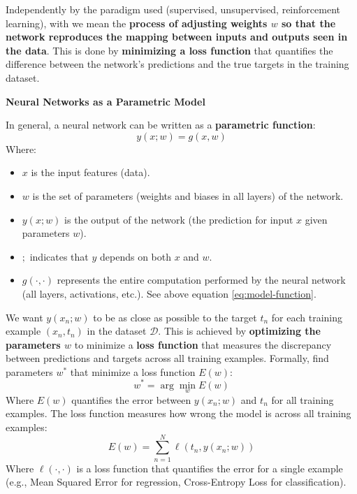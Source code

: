 \highspace
Independently by the paradigm used (supervised, unsupervised, reinforcement learning), with  we mean the \textbf{process of adjusting weights $w$ so that the network reproduces the mapping between inputs and outputs seen in the data}. This is done by \textbf{minimizing a loss function} that quantifies the difference between the network's predictions and the true targets in the training dataset.

\highspace
\begin{flushleft}
    \textcolor{Green3}{ \textbf{Neural Networks as a Parametric Model}}
\end{flushleft}
In general, a neural network can be written as a \textbf{parametric function}:
\begin{equation}
    y\left(x; w\right) = g\left(x, w\right)
\end{equation}
Where:
\begin{itemize}
    \item $x$ is the input features (data).
    \item $w$ is the set of parameters (weights and biases in all layers) of the network.
    \item $y\left(x; w\right)$ is the output of the network (the prediction for input $x$ given parameters $w$).
    \item $;$ indicates that $y$ depends on both $x$ and $w$.
    \item $g(\cdot, \cdot)$ represents the entire computation performed by the neural network (all layers, activations, etc.). See above equation \ref{eq:model-function}.
\end{itemize}
We want $y\left(x_{n}; w\right)$ to be as close as possible to the target $t_{n}$ for each training example $\left(x_{n}, t_{n}\right)$ in the dataset $\mathcal{D}$. This is achieved by \textbf{optimizing the parameters $w$} to minimize a \textbf{loss function} that measures the discrepancy between predictions and targets across all training examples. Formally, find parameters $w^{*}$ that minimize a loss function $E(w)$:
\begin{equation}
    w^{*} = \arg\min_{w} E\left(w\right)
\end{equation}
Where $E(w)$ quantifies the error between $y\left(x_{n}; w\right)$ and $t_{n}$ for all training examples. The loss function measures how wrong the model is across all training examples:
\begin{equation}
    E\left(w\right) = \displaystyle\sum_{n=1}^{N} \ell\left(t_{n}, y\left(x_{n}; w\right)\right)
\end{equation}
Where $\ell(\cdot, \cdot)$ is a loss function that quantifies the error for a single example (e.g., Mean Squared Error for regression, Cross-Entropy Loss for classification).

